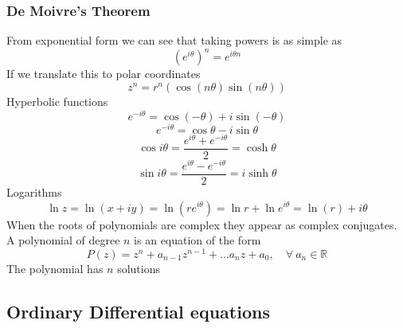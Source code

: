 \documentclass[11pt,titlepage]{article}
\numberwithin{equation}{subsection}
\begin{document}
\subsubsection{De Moivre's Theorem}
From exponential form we can see that taking powers is as simple as
\begin{equation}
    (e^{i\theta})^n=e^{i\theta n}
\end{equation}
If we translate this to polar coordinates
\begin{equation}
    z^n=r^n(\cos(n\theta)\sin(n\theta))
\end{equation}
Hyperbolic functions
\begin{equation}
    e^{-i\theta}=\cos(-\theta)+i\sin(-\theta)
\end{equation}
\begin{equation}
    e^{-i\theta}=\cos \theta-i\sin \theta
\end{equation}
\begin{equation}
    \cos i\theta=\frac{e^{i\theta}+{e^{-i\theta}}}{2}=\cosh \theta
\end{equation}
\begin{equation}
    \sin i\theta=\frac{e^{i\theta}-e^{-i\theta}}{2}=i\sinh \theta
\end{equation}
Logarithms
\begin{equation}
    \ln z=\ln(x+iy)=\ln(re^{i\theta})=\ln r +\ln e^{i\theta}=\ln (r)+i\theta
\end{equation}
When the roots of polynomials are complex they appear as complex conjugates. A polynomial of degree $n$ is an equation of the form
\begin{equation}
    P(z)=z^n+a_{n-1}z^{n-1}+\dots a_{n}z+a_{0},\quad\forall \ a_{n} \in \mathbb R
\end{equation}
The polynomial has $n$ solutions
\subsection{Ordinary Differential equations}
\end{document}
